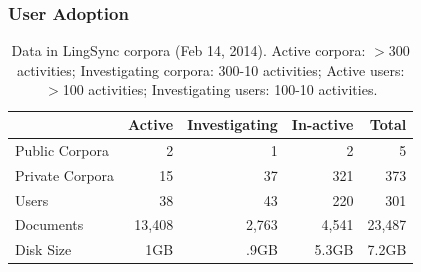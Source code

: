\documentclass{beamer}
\begin{document}
\begin{frame}
\frametitle{User Adoption}
\begin{table}[h]
\begin{center}
\scriptsize
\begin{tabular}{lrrrr}
      \toprule
                     ~ &  Active & Investigating & In-active & Total\\
      \midrule
      Public Corpora  &       2 &   1 &   2 & 5 \\ 
      Private Corpora &      15 &  37 & 321 & 373\\ 
      Users           &      38 &  43 & 220 & 301 \\
      Documents & 13,408 & 2,763 & 4,541 &23,487\\
      Disk Size & 1GB & .9GB & 5.3GB& 7.2GB\\
      
      \bottomrule

\end{tabular}
\caption{Data in LingSync corpora (Feb 14, 2014). Active corpora: $>$300
activities; Investigating corpora: 300-10 activities; Active users: $>$100
activities; Investigating users: 100-10 activities.}
\label{lingsync-data}
 \end{center}
 \normalsize
\end{table}

\end{frame}
\end{document}
